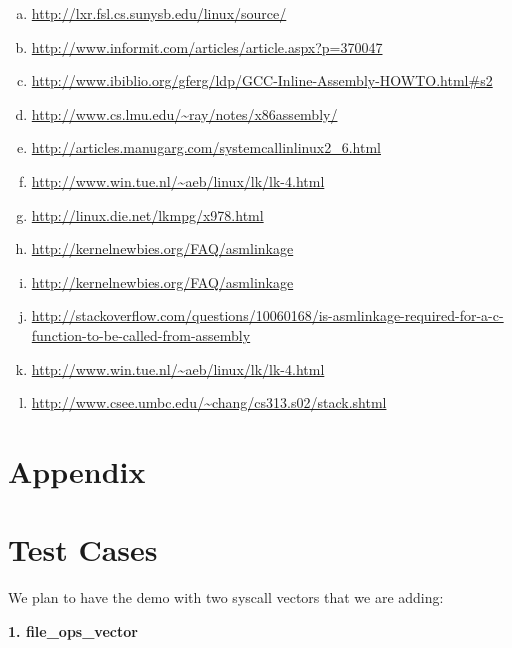 \documentclass[11pt]{article}
\begin{document}
\begin{enumerate}[(a)]
\item
\url{http://lxr.fsl.cs.sunysb.edu/linux/source/}

\item
\url{http://www.informit.com/articles/article.aspx?p=370047}

\item
\url{http://www.ibiblio.org/gferg/ldp/GCC-Inline-Assembly-HOWTO.html#s2}

\item
\url{http://www.cs.lmu.edu/~ray/notes/x86assembly/}

\item
\url{http://articles.manugarg.com/systemcallinlinux2_6.html}

\item
\url{http://www.win.tue.nl/~aeb/linux/lk/lk-4.html}

\item
\url{http://linux.die.net/lkmpg/x978.html}

\item
\url{http://kernelnewbies.org/FAQ/asmlinkage}

\item
\url{http://kernelnewbies.org/FAQ/asmlinkage}

\item
\url{http://stackoverflow.com/questions/10060168/is-asmlinkage-required-for-a-c-function-to-be-called-from-assembly}

\item
\url{http://www.win.tue.nl/~aeb/linux/lk/lk-4.html}

\item
\url{http://www.csee.umbc.edu/~chang/cs313.s02/stack.shtml}

\end{enumerate}

\newpage

\appendix

\section*{Appendix}

\section{ Test Cases}

We plan to have the demo with two syscall vectors that we are adding: 

\noindent
 \textbf{1. file\_ops\_vector}
\end{document}
